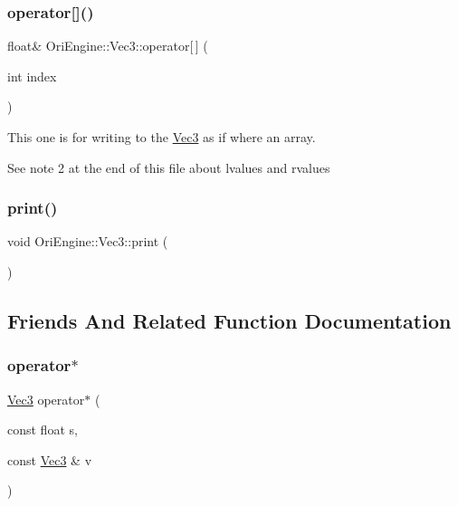 \subsubsection{\texorpdfstring{operator[]()}{operator[]()}\hspace{0.1cm}{\footnotesize\ttfamily [2/2]}}
{\footnotesize\ttfamily float\& Ori\+Engine\+::\+Vec3\+::operator\mbox{[}$\,$\mbox{]} (\begin{DoxyParamCaption}\item[{int}]{index }\end{DoxyParamCaption})\hspace{0.3cm}{\ttfamily [inline]}}

This one is for writing to the \hyperlink{struct_ori_engine_1_1_vec3}{Vec3} as if where an array.

See note 2 at the end of this file about lvalues and rvalues \hypertarget{struct_ori_engine_1_1_vec3_a87155de383da7584fbe0725b3a4e371d}{}\label{struct_ori_engine_1_1_vec3_a87155de383da7584fbe0725b3a4e371d} 
\subsubsection{\texorpdfstring{print()}{print()}}
{\footnotesize\ttfamily void Ori\+Engine\+::\+Vec3\+::print (\begin{DoxyParamCaption}{ }\end{DoxyParamCaption})\hspace{0.3cm}{\ttfamily [inline]}}



\subsection{Friends And Related Function Documentation}
\hypertarget{struct_ori_engine_1_1_vec3_aadc3cbbff02e566f5b84a5cccc5e0fa0}{}\label{struct_ori_engine_1_1_vec3_aadc3cbbff02e566f5b84a5cccc5e0fa0} 
\subsubsection{\texorpdfstring{operator$\ast$}{operator*}}
{\footnotesize\ttfamily \hyperlink{struct_ori_engine_1_1_vec3}{Vec3} operator$\ast$ (\begin{DoxyParamCaption}\item[{const float}]{s,  }\item[{const \hyperlink{struct_ori_engine_1_1_vec3}{Vec3} \&}]{v }\end{DoxyParamCaption})\hspace{0.3cm}{\ttfamily [friend]}}

